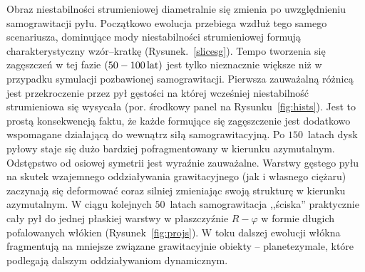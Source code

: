 %
\par Obraz niestabilności strumieniowej diametralnie się zmienia po
uwzględnieniu samograwitacji pyłu. Początkowo ewolucja przebiega wzdłuż tego
samego scenariusza, dominujące mody niestabilności strumieniowej formują
charakterystyczny wzór--kratkę (Rysunek.~\ref{slicesg}). Tempo tworzenia się
zagęszczeń w tej fazie $(50 - 100\hbox{$\thinspace\textrm{lat}$})$ jest tylko nieznacznie większe niż w
przypadku symulacji pozbawionej samograwitacji. Pierwsza zauważalną różnicą jest
przekroczenie przez pył gęstości na której wcześniej niestabilność strumieniowa
się wysycała (por. środkowy panel na Rysunku~\ref{fig:hists}). Jest to prostą
konsekwencją faktu, że każde formujące się zagęszczenie jest dodatkowo
wspomagane działającą do wewnątrz siłą samograwitacyjną. Po $150$~latach dysk pyłowy
staje się dużo bardziej pofragmentowany w kierunku azymutalnym. Odstępstwo od
osiowej symetrii jest wyraźnie zauważalne. Warstwy gęstego pyłu na skutek
wzajemnego oddziaływania grawitacyjnego (jak i własnego ciężaru) zaczynają się
deformować coraz silniej zmieniając swoją strukturę w kierunku azymutalnym. W
ciągu kolejnych $50$~latach samograwitacja ,,ściska'' praktycznie cały pył do jednej
płaskiej warstwy w płaszczyźnie $R - \varphi$ w formie długich pofalowanych
włókien (Rysunek~\ref{fig:projs}). W toku dalszej ewolucji włókna fragmentują na
mniejsze związane grawitacyjnie obiekty -- planetezymale, które podlegają
dalszym oddziaływaniom dynamicznym. 
%

